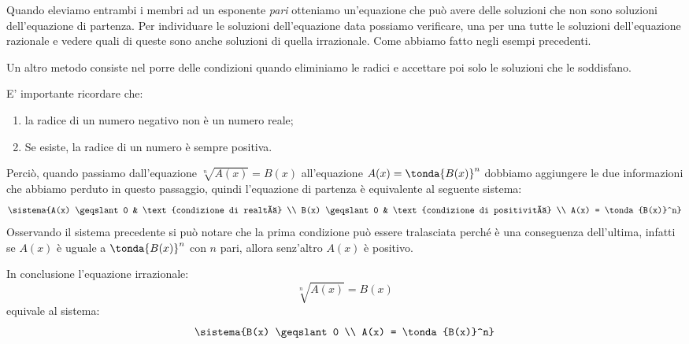 
Quando eleviamo entrambi i membri ad un esponente \emph{pari} otteniamo 
un'equazione che può avere delle soluzioni che non sono soluzioni 
dell'equazione di partenza. Per individuare le soluzioni dell'equazione data 
possiamo verificare, una per una tutte le soluzioni dell'equazione razionale e 
vedere quali di queste sono anche soluzioni di quella irrazionale. Come abbiamo 
fatto negli esempi precedenti.

Un altro metodo consiste nel porre delle condizioni quando eliminiamo le radici 
e accettare poi solo le soluzioni che le soddisfano.

E' importante ricordare che:
\begin{enumerate}
 \item la radice di un numero negativo non è un numero reale;
 \item Se esiste, la radice di un numero è sempre positiva.
\end{enumerate}

Perciò, quando passiamo dall'equazione \(\sqrt[n]{A(x)} = B(x)\) 
all'equazione \(A(x) = \tonda{B(x)}^n\)  dobbiamo aggiungere le due 
informazioni che abbiamo perduto in questo passaggio, quindi l'equazione di 
partenza è equivalente al seguente sistema:
\[\sistema{A(x) \geqslant 0 & \text{condizione di realtà} \\
           B(x) \geqslant 0 & \text{condizione di positività} \\
           A(x) = \tonda{B(x)}^n}
\]
Osservando il sistema precedente si può notare che la 
prima condizione può essere tralasciata perché è una conseguenza 
dell'ultima, infatti se \(A(x)\) è uguale a 
\(\tonda{B(x)}^n\) con \(n\) pari, allora senz'altro \(A(x)\) è positivo.

In conclusione l'equazione irrazionale: 
\[\sqrt[n]{A(x)} = B(x)\]
equivale al sistema:
\[\sistema{B(x) \geqslant 0 \\
           A(x) = \tonda{B(x)}^n}
\]

